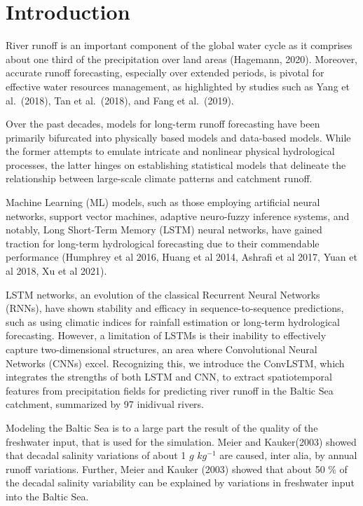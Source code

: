 \documentclass[
]{agujournal2019}
\begin{document}
\hypertarget{introduction}{%
\section{Introduction}\label{introduction}}

River runoff is an important component of the global water cycle as it
comprises about one third of the precipitation over land areas
(Hagemann, 2020). Moreover, accurate runoff forecasting, especially over
extended periods, is pivotal for effective water resources management,
as highlighted by studies such as Yang et al.~(2018), Tan et al.~(2018),
and Fang et al.~(2019).

Over the past decades, models for long-term runoff forecasting have been
primarily bifurcated into physically based models and data-based models.
While the former attempts to emulate intricate and nonlinear physical
hydrological processes, the latter hinges on establishing statistical
models that delineate the relationship between large-scale climate
patterns and catchment runoff.

Machine Learning (ML) models, such as those employing artificial neural
networks, support vector machines, adaptive neuro-fuzzy inference
systems, and notably, Long Short-Term Memory (LSTM) neural networks,
have gained traction for long-term hydrological forecasting due to their
commendable performance (Humphrey et al 2016, Huang et al 2014, Ashrafi
et al 2017, Yuan et al 2018, Xu et al 2021).

LSTM networks, an evolution of the classical Recurrent Neural Networks
(RNNs), have shown stability and efficacy in sequence-to-sequence
predictions, such as using climatic indices for rainfall estimation or
long-term hydrological forecasting. However, a limitation of LSTMs is
their inability to effectively capture two-dimensional structures, an
area where Convolutional Neural Networks (CNNs) excel. Recognizing this,
we introduce the ConvLSTM, which integrates the strengths of both LSTM
and CNN, to extract spatiotemporal features from precipitation fields
for predicting river runoff in the Baltic Sea catchment, summarized by
97 inidivual rivers.

Modeling the Baltic Sea is to a large part the result of the quality of
the freshwater input, that is used for the simulation. Meier and
Kauker(2003) showed that decadal salinity variations of about 1 \(g\)
\(kg^{-1}\) are caused, inter alia, by annual runoff variations.
Further, Meier and Kauker (2003) showed that about 50 \% of the decadal
salinity variability can be explained by variations in freshwater input
into the Baltic Sea.
\end{document}
